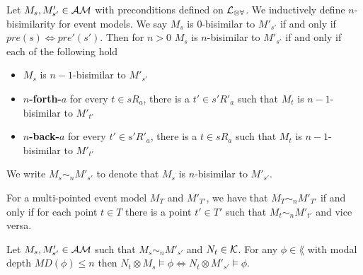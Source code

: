 \begin{defn} \label{nBisimEvent}
	Let $M_s, M'_{s'} \in \mathcal{AM}$ with preconditions defined on $\mathcal{L}_{\otimes\forall}$.
	We inductively define $n$-bisimilarity for event models.
	We say $M_s$ is $0$-bisimilar to $M'_{s'}$ if and only if $pre(s) \iff pre'(s')$.
	Then for $n>0$ $M_s$ is $n$-bisimilar to $M'_{s'}$ if and only if each of the following hold
	\begin{itemize}
		\item $M_s$ is $n-1$-bisimilar to $M'_{s'}$
		\item {\bf $n$-forth-$a$} for every $t \in s R_a$, there is a $t' \in s' R'_a$ such that $M_t$ is
		$n-1$-bisimilar to $M'_{t'}$
		\item {\bf $n$-back-$a$} for every $t' \in s' R'_a$, there is a $t \in s R_a$ such that $M_t$ is
		$n-1$-bisimilar to $M'_{t'}$
	\end{itemize}
	We write $M_s \sim_n M'_{s'}$ to denote that $M_s$ is $n$-bisimilar to $M'_{s'}$.
\end{defn}

For a multi-pointed event model $M_T$ and $M'_{T'}$, we have that $M_T \sim_n
M'_{T'}$ if and only if for each point $t \in T$ there is a point $t' \in T'$
such that $M_t \sim_n M'_{t'}$ and vice versa.

\begin{lemma} \label{nBisimilarEventExec}
	Let $M_s, M'_{s'} \in \mathcal{AM}$ such that $M_s \sim_n M'_{s'}$ and $N_t \in \mathcal{K}$.
	For any $\phi \in \lang$ with modal depth $MD(\phi) \leq n$ then $N_t \otimes M_s \models \phi
	\iff N_t \otimes M'_{s'} \models \phi$.
\end{lemma}

